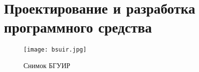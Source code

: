 \section{Проектирование и разработка программного средства}

\begin{figure}[H]
	\centering
	\texttt{[image: bsuir.jpg]}
	\caption{Снимок БГУИР}
\end{figure}

\newpage
